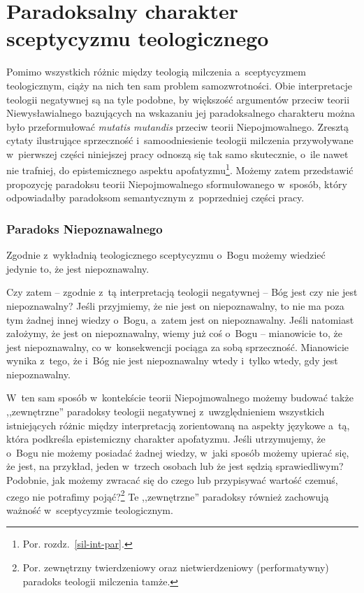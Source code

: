 \section{Paradoksalny charakter sceptycyzmu teologicznego}

Pomimo wszystkich różnic między teologią milczenia a~sceptycyzmem teologicznym, ciąży na nich ten sam problem samozwrotności. Obie interpretacje teologii negatywnej są na tyle podobne, by większość argumentów przeciw teorii Niewysławialnego bazujących na wskazaniu jej paradoksalnego charakteru można było przeformułować \textit{mutatis mutandis} przeciw teorii Niepojmowalnego. Zresztą cytaty ilustrujące sprzeczność i~samoodniesienie teologii milczenia przywoływane w~pierwszej części niniejszej pracy odnoszą się tak samo skutecznie, o~ile nawet nie trafniej, do epistemicznego aspektu apofatyzmu\footnote{Por. rozdz.~\ref{sil-int-par}.}. Możemy zatem przedstawić propozycję paradoksu teorii Niepojmowalnego sformułowanego w~sposób, który odpowiadałby paradoksom semantycznym z~poprzedniej części pracy.

\subsubsection{Paradoks Niepoznawalnego}

Zgodnie z~wykładnią teologicznego sceptycyzmu o~Bogu możemy wiedzieć jedynie to, że jest niepoznawalny.

Czy zatem -- zgodnie z~tą interpretacją teologii negatywnej -- Bóg jest czy nie jest niepoznawalny? Jeśli przyjmiemy, że nie jest on niepoznawalny, to nie ma poza tym żadnej innej wiedzy o~Bogu, a~zatem jest on niepoznawalny. Jeśli natomiast założymy, że jest on niepoznawalny, wiemy już coś o~Bogu -- mianowicie to, że jest niepoznawalny, co w~konsekwencji pociąga za sobą sprzeczność. Mianowicie wynika z~tego, że i~Bóg nie jest niepoznawalny wtedy i~tylko wtedy, gdy jest niepoznawalny.

W~ten sam sposób w~kontekście teorii Niepojmowalnego możemy budować także ,,zewnętrzne'' paradoksy teologii negatywnej z~uwzględnieniem wszystkich istniejących różnic między interpretacją zorientowaną na aspekty językowe a~tą, która podkreśla epistemiczny charakter apofatyzmu. Jeśli utrzymujemy, że o~Bogu nie możemy posiadać żadnej wiedzy, w~jaki sposób możemy upierać się, że jest, na przykład, jeden w~trzech osobach lub że jest sędzią sprawiedliwym? Podobnie, jak możemy zwracać się do czego lub przypisywać wartość czemuś, czego nie potrafimy pojąć?\footnote{Por. zewnętrzny twierdzeniowy oraz nietwierdzeniowy (performatywny) paradoks teologii milczenia tamże.} Te ,,zewnętrzne'' paradoksy również zachowują ważność w~sceptycyzmie teologicznym.


